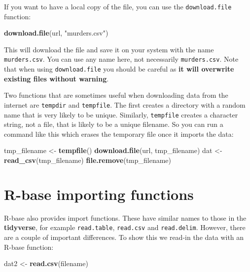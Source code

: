 \documentclass[
]{krantz}
\newenvironment{Shaded}{\begin{snugshade}}{\end{snugshade}}
\newcommand{\KeywordTok}[1]{\textcolor[rgb]{0.27,0.27,0.27}{\textbf{#1}}}
\newcommand{\NormalTok}[1]{#1}
\newcommand{\StringTok}[1]{\textcolor[rgb]{0.5,0.5,0.5}{#1}}
\begin{document}
If you want to have a local copy of the file, you can use the \texttt{download.file} function:

\begin{Shaded}
\begin{Highlighting}[]
\KeywordTok{download.file}\NormalTok{(url, }\StringTok{"murders.csv"}\NormalTok{)}
\end{Highlighting}
\end{Shaded}

This will download the file and save it on your system with the name \texttt{murders.csv}. You can use any name here, not necessarily \texttt{murders.csv}. Note that when using \texttt{download.file} you should be careful as \textbf{it will overwrite existing files without warning}.

Two functions that are sometimes useful when downloading data from the internet are \texttt{tempdir} and \texttt{tempfile}. The first creates a directory with a random name that is very likely to be unique. Similarly, \texttt{tempfile} creates a character string, not a file, that is likely to be a unique filename. So you can run a command like this which erases the temporary file once it imports the data:

\begin{Shaded}
\begin{Highlighting}[]
\NormalTok{tmp_filename <-}\StringTok{ }\KeywordTok{tempfile}\NormalTok{()}
\KeywordTok{download.file}\NormalTok{(url, tmp_filename)}
\NormalTok{dat <-}\StringTok{ }\KeywordTok{read_csv}\NormalTok{(tmp_filename)}
\KeywordTok{file.remove}\NormalTok{(tmp_filename)}
\end{Highlighting}
\end{Shaded}

\hypertarget{r-base-importing-functions}{%
\section{R-base importing functions}\label{r-base-importing-functions}}

R-base also provides import functions. These have similar names to those in the \textbf{tidyverse}, for example \texttt{read.table}, \texttt{read.csv} and \texttt{read.delim}. However, there are a couple of important differences. To show this we read-in the data with an R-base function:

\begin{Shaded}
\begin{Highlighting}[]
\NormalTok{dat2 <-}\StringTok{ }\KeywordTok{read.csv}\NormalTok{(filename)}
\end{Highlighting}
\end{Shaded}
\end{document}
